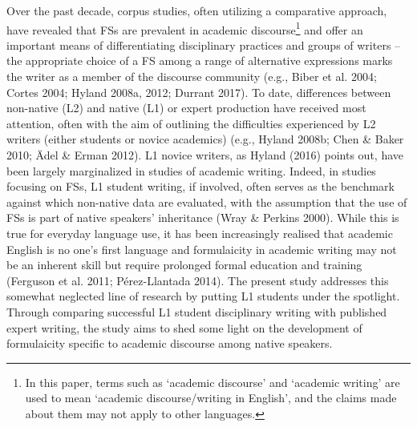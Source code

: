 \begin{styleStandard}
Over the past decade, corpus studies, often utilizing a comparative approach, have revealed that FSs are prevalent in academic discourse\footnote{ In this paper, terms such as ‘academic discourse’ and ‘academic writing’ are used to mean ‘academic discourse/writing in English’, and the claims made about them may not apply to other languages.} and offer an important means of differentiating disciplinary practices and groups of writers – the appropriate choice of a FS among a range of alternative expressions marks the writer as a member of the discourse community (e.g., Biber et al. 2004; Cortes 2004; Hyland 2008a, 2012; Durrant 2017). To date, differences between non-native (L2) and native (L1) or expert production have received most attention, often with the aim of outlining the difficulties experienced by L2 writers (either students or novice academics) (e.g., Hyland 2008b; Chen \& Baker 2010; Ädel \& Erman 2012). L1 novice writers, as Hyland (2016) points out, have been largely marginalized in studies of academic writing. Indeed, in studies focusing on FSs, L1 student writing, if involved, often serves as the benchmark against which non-native data are evaluated, with the assumption that the use of FSs is part of native speakers’ inheritance (Wray \& Perkins 2000). While this is true for everyday language use, it has been increasingly realised that academic English is no one’s first language and formulaicity in academic writing may not be an inherent skill but require prolonged formal education and training (Ferguson et al. 2011; Pérez-Llantada 2014). The present study addresses this somewhat neglected line of research by putting L1 students under the spotlight. Through comparing successful L1 student disciplinary writing with published expert writing, the study aims to shed some light on the development of formulaicity specific to academic discourse among native speakers. 
\end{styleStandard}

